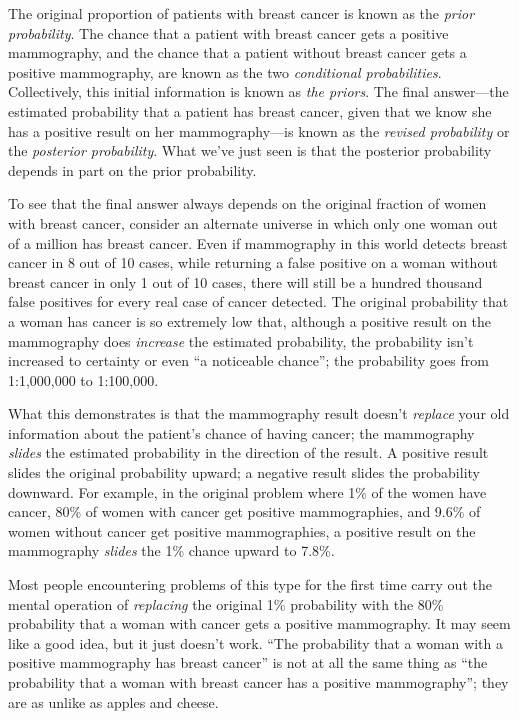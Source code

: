 {{{
 The original proportion of patients with breast cancer is known as
the \textit{prior probability}. The chance that a patient with breast
cancer gets a positive mammography, and the chance that a patient
without breast cancer gets a positive mammography, are known as the two
\textit{conditional probabilities}. Collectively, this initial
information is known as \textit{the priors}. The final answer---the
estimated probability that a patient has breast cancer, given that we
know she has a positive result on her mammography---is known as the
\textit{revised probability} or the \textit{posterior probability}.
What we've just seen is that the posterior probability
depends in part on the prior probability.}

{
 To see that the final answer always depends on the original
fraction of women with breast cancer, consider an alternate universe in
which only one woman out of a million has breast cancer. Even if
mammography in this world detects breast cancer in 8 out of 10 cases,
while returning a false positive on a woman without breast cancer in
only 1 out of 10 cases, there will still be a hundred thousand false
positives for every real case of cancer detected. The original
probability that a woman has cancer is so extremely low that, although
a positive result on the mammography does \textit{increase} the
estimated probability, the probability isn't increased
to certainty or even ``a noticeable
chance''; the probability goes from 1:1,000,000 to
1:100,000.}

{
 What this demonstrates is that the mammography result
doesn't \textit{replace} your old information about the
patient's chance of having cancer; the mammography
\textit{slides} the estimated probability in the direction of the
result. A positive result slides the original probability upward; a
negative result slides the probability downward. For example, in the
original problem where 1\% of the women have cancer, 80\% of women with
cancer get positive mammographies, and 9.6\% of women without cancer
get positive mammographies, a positive result on the mammography
\textit{slides} the 1\% chance upward to 7.8\%.}

{
 Most people encountering problems of this type for the first time
carry out the mental operation of \textit{replacing} the original 1\%
probability with the 80\% probability that a woman with cancer gets a
positive mammography. It may seem like a good idea, but it just
doesn't work. ``The probability that a
woman with a positive mammography has breast cancer''
is not at all the same thing as ``the probability that
a woman with breast cancer has a positive
mammography''; they are as unlike as apples and
cheese.}

}}

